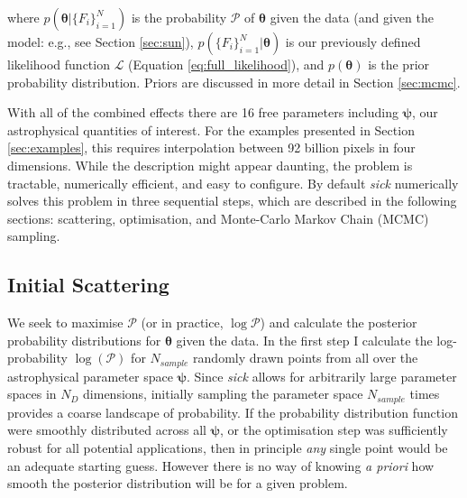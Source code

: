 \documentclass{aastex}
\newcommand{\sick}{\textit{sick}}
\begin{document}
\noindent{}where $p(\bm{\theta}|\{F_i\}_{i=1}^{N})$ is the probability $\mathcal{P}$ of $\bm{\theta}$ given the data (and given the model: e.g., see Section \ref{sec:sun}), $p(\{F_i\}_{i=1}^{N}|\bm{\theta})$ is our previously defined likelihood function $\mathcal{L}$ (Equation \ref{eq:full_likelihood}), and $p(\bm{\theta})$ is the prior probability distribution. Priors are discussed in more detail in Section \ref{sec:mcmc}. 


With all of the combined effects there are 16 free parameters including $\bm{\psi}$, our astrophysical quantities of interest. For the examples presented in Section \ref{sec:examples}, this requires interpolation between 92 billion pixels in four dimensions. While the description might appear daunting, the problem is tractable, numerically efficient, and easy to configure. By default \sick{} numerically solves this problem in three sequential steps, which are described in the following sections: scattering, optimisation, and Monte-Carlo Markov Chain (MCMC) sampling.


\subsection{Initial Scattering}
\label{sec:scattering}

We seek to maximise $\mathcal{P}$ (or in practice, $\log\mathcal{P}$) and calculate the posterior probability distributions for $\bm{\theta}$ given the data. In the first step I calculate the log-probability $\log{(\mathcal{P})}$ for $N_{sample}$ randomly drawn points from all over the astrophysical parameter space $\bm{\psi}$. Since \sick{} allows for arbitrarily large parameter spaces in $N_{D}$ dimensions, initially sampling the parameter space $N_{sample}$ times provides a coarse landscape of probability. If the probability distribution function were smoothly distributed across all $\bm{\psi}$, or the optimisation step was sufficiently robust for all potential applications, then in principle \textit{any} single point would be an adequate starting guess. However there is no way of knowing \textit{a priori} how smooth the posterior distribution will be for a given problem. 
\end{document}
